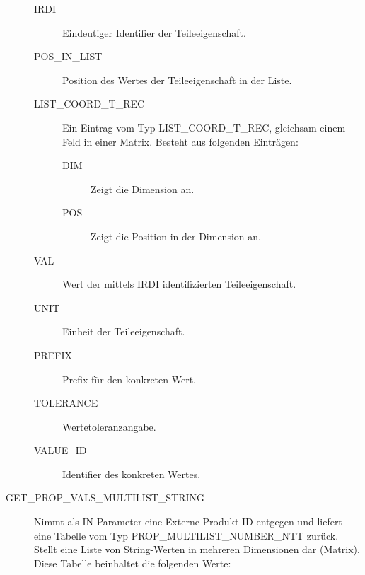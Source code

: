 \begin{description}
  \begin{description}
  \item[IRDI] Eindeutiger Identifier der Teileeigenschaft.
  \item[POS\_IN\_LIST] Position des Wertes der Teileeigenschaft in der Liste.
  \item[LIST\_COORD\_T\_REC] Ein Eintrag vom Typ LIST\_COORD\_T\_REC, gleichsam einem Feld in einer Matrix. Besteht aus folgenden Einträgen:
    \begin{description}	
    \item[DIM] Zeigt die Dimension an.
    \item[POS] Zeigt die Position in der Dimension an. 
    \end{description}
  \item[VAL] Wert der mittels IRDI identifizierten Teileeigenschaft.
  \item[UNIT] Einheit der Teileeigenschaft.
  \item[PREFIX] Prefix für den konkreten Wert.
  \item[TOLERANCE] Wertetoleranzangabe.
  \item[VALUE\_ID] Identifier des konkreten Wertes.
  \end{description}

\item[GET\_PROP\_VALS\_MULTILIST\_STRING]  Nimmt als IN-Parameter eine Externe Produkt-ID entgegen und liefert eine Tabelle vom Typ PROP\_MULTILIST\_NUMBER\_NTT zurück. Stellt eine Liste von String-Werten in mehreren Dimensionen dar (Matrix). 
Diese Tabelle beinhaltet die folgenden Werte: 


\end{description}
